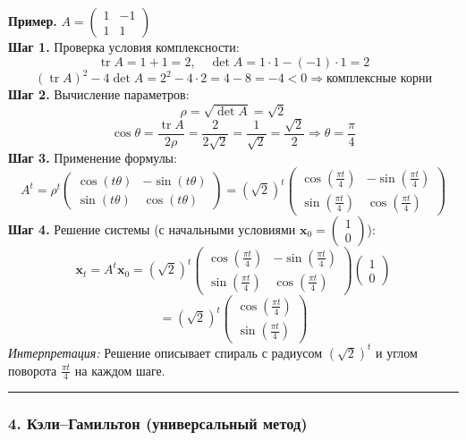 \textbf{Пример.} $A = \begin{pmatrix} 1 & -1 \\ 1 & 1 \end{pmatrix}$\\
\textbf{Шаг 1.} Проверка условия комплексности:
$$\operatorname{tr}A = 1 + 1 = 2, \quad \det A = 1 \cdot 1 - (-1) \cdot 1 = 2$$
$$(\operatorname{tr}A)^2 - 4\det A = 2^2 - 4 \cdot 2 = 4 - 8 = -4 < 0 \Rightarrow \text{комплексные корни}$$
\textbf{Шаг 2.} Вычисление параметров:
$$\rho = \sqrt{\det A} = \sqrt{2}$$
$$\cos\theta = \frac{\operatorname{tr}A}{2\rho} = \frac{2}{2\sqrt{2}} = \frac{1}{\sqrt{2}} = \frac{\sqrt{2}}{2} \Rightarrow \theta = \frac{\pi}{4}$$
\textbf{Шаг 3.} Применение формулы:
$$A^t = \rho^t \begin{pmatrix} \cos(t\theta) & -\sin(t\theta) \\ \sin(t\theta) & \cos(t\theta) \end{pmatrix} = (\sqrt{2})^t \begin{pmatrix} \cos\left(\frac{\pi t}{4}\right) & -\sin\left(\frac{\pi t}{4}\right) \\ \sin\left(\frac{\pi t}{4}\right) & \cos\left(\frac{\pi t}{4}\right) \end{pmatrix}$$
\textbf{Шаг 4.} Решение системы (с начальными условиями $\mathbf{x}_0 = \begin{pmatrix} 1 \\ 0 \end{pmatrix}$):
$$\mathbf{x}_t = A^t\mathbf{x}_0 = (\sqrt{2})^t \begin{pmatrix} \cos\left(\frac{\pi t}{4}\right) & -\sin\left(\frac{\pi t}{4}\right) \\ \sin\left(\frac{\pi t}{4}\right) & \cos\left(\frac{\pi t}{4}\right) \end{pmatrix}\begin{pmatrix} 1 \\ 0 \end{pmatrix}$$
$$= (\sqrt{2})^t \begin{pmatrix} \cos\left(\frac{\pi t}{4}\right) \\ \sin\left(\frac{\pi t}{4}\right) \end{pmatrix}$$
\textit{Интерпретация:} Решение описывает спираль с радиусом $(\sqrt{2})^t$ и углом поворота $\frac{\pi t}{4}$ на каждом шаге.

\bigskip
\hrule
\bigskip

\subsubsection*{4. Кэли–Гамильтон (универсальный метод)}


